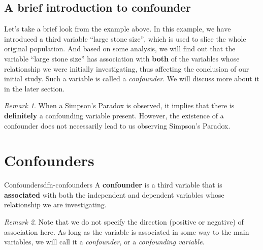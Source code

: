 \documentclass[math,code]{amznotes}
\theoremstyle{remark}
\newtheorem*{remark}{Remark}
\begin{document}
\subsection{A brief introduction to confounder}
Let's take a brief look from the example above. In this example, we have introduced a third variable ``large stone size'', which is used to slice the whole original population. And based on some analysis, we will find out that the variable ``large stone size'' has association with \textbf{both} of the variables whose relationship we were initially investigating, thus affecting the conclusion of our initial study. Such a variable is called a \textit{confounder}. We will discuss more about it in the later section.
\begin{notebox}
    \begin{remark}
        When a Simpson's Paradox is observed, it implies that there is \textbf{definitely} a confounding variable present. However, the existence of a confounder does not necessarily lead to us observing Simpson's Paradox.
    \end{remark}
\end{notebox}

\section{Confounders}
\begin{dfnbox}{Confounders}{dfn-confounders}
    A {\color{red} \textbf{confounder}} is a third variable that is \textbf{associated} with both the independent and dependent variables whose relationship we are investigating.
\end{dfnbox}
\begin{notebox}
    \begin{remark}
        Note that we do not specify the direction (positive or negative) of association here. As long as the variable is associated in some way to the main variables, we will call it a \textit{confounder}, or a \textit{confounding variable}.
    \end{remark}
\end{notebox}
\end{document}
